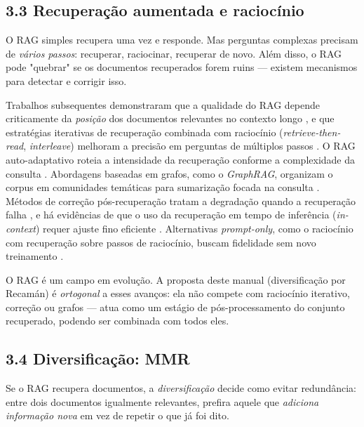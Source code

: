 \subsection*{3.3 Recuperação aumentada e raciocínio}

 O RAG simples recupera uma vez e responde. Mas perguntas complexas
precisam de \emph{vários passos}: recuperar, raciocinar, recuperar de novo. Além
disso, o RAG pode "quebrar" se os documentos recuperados forem ruins --- existem
mecanismos para detectar e corrigir isso.

 Trabalhos subsequentes demonstraram que a qualidade do RAG depende
criticamente da \emph{posição} dos documentos relevantes no contexto longo
\cite{Liu2024LostMiddle}, e que estratégias iterativas de recuperação combinada
com raciocínio (\emph{retrieve-then-read}, \emph{interleave}) melhoram a precisão
em perguntas de múltiplos passos \cite{IzacardGrave2021LeveragingPassages,
Trivedi2023Interleaving}. O RAG auto-adaptativo roteia a intensidade da
recuperação conforme a complexidade da consulta \cite{Jeong2024AdaptiveRAG}.
Abordagens baseadas em grafos, como o \emph{GraphRAG}, organizam o corpus em
comunidades temáticas para sumarização focada na consulta \cite{Edge2024GraphRAG}.
Métodos de correção pós-recuperação tratam a degradação quando a recuperação
falha \cite{Yan2024CRAG}, e há evidências de que o uso da recuperação em tempo de
inferência (\emph{in-context}) requer ajuste fino eficiente
\cite{Ram2023RetrievalAugmented}. Alternativas \emph{prompt-only}, como o
raciocínio com recuperação sobre passos de raciocínio, buscam fidelidade sem novo
treinamento \cite{He2023RethinkingRetrieval}.

\begin{pontochave}
O RAG é um campo em evolução. A proposta deste manual (diversificação por Recamán)
é \emph{ortogonal} a esses avanços: ela não compete com raciocínio iterativo,
correção ou grafos --- atua como um estágio de pós-processamento do conjunto
recuperado, podendo ser combinada com todos eles.
\end{pontochave}

\subsection*{3.4 Diversificação: MMR}

 Se o RAG recupera documentos, a \emph{diversificação} decide como evitar
redundância: entre dois documentos igualmente relevantes, prefira aquele que
\emph{adiciona informação nova} em vez de repetir o que já foi dito.

